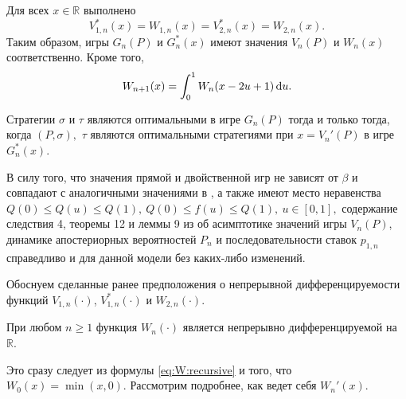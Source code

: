 \begin{theorem}\label{theorem:dual:relations}
  Для всех $x \in \mathbb{R}$ выполнено
  \begin{equation}\label{eq:duality:relationships}
    V_{1,n}^*(x) = W_{1,n}(x) = V_{2,n}^*(x) = W_{2,n}(x).
  \end{equation}
  Таким образом, игры $G_n(P)$ и $G_n^*(x)$ имеют значения $V_n(P)$ и $W_n(x)$
  соответственно. Кроме того,
  \begin{equation}\label{eq:W:recursive}
    W_{n+1}(x) = \int_0^1 W_n(x - 2u + 1) \mathop{}\!\mathrm{d} u.
  \end{equation}
\end{theorem}

\begin{theorem}\label{theorem:optimal-strategies}
  Стратегии $\sigma$ и $\tau$ являются оптимальными в игре $G_n(P)$ тогда и
  только тогда, когда $(P, \sigma),$ $\tau$ являются оптимальными стратегиями
  при $x = V_n'(P)$ в игре $G_n^*(x)$.
\end{theorem}

В силу того, что значения прямой и двойственной игр не зависят от $\beta$ и
совпадают с аналогичными значениями в \cite{demeyer02}, а также имеют место
неравенства %
$ Q(0) \leqslant Q(u) \leqslant Q(1),\ Q(0) \leqslant f(u) \leqslant Q(1),\ u
\in [0, 1], $ %
содержание следствия 4, теоремы 12 и леммы 9 из \cite{demeyer02} об асимптотике
значений игры $V_n(P)$, динамике апостериорных вероятностей $P_n$ и
последовательности ставок $p_{1,n}$ справедливо и для данной модели без
каких-либо изменений.

Обоснуем сделанные ранее предположения о непрерывной дифференцируемости функций
$V_{1,n}(\cdot)$, $V_{1,n}^*(\cdot)$ и $W_{2,n}(\cdot)$.

\begin{proposition}
  При любом $n \geqslant 1$ функция $W_n(\cdot)$ является непрерывно
  дифференцируемой на $\mathbb{R}$.
\end{proposition}
Это сразу следует из формулы \eqref{eq:W:recursive} и того, что $W_0(x) =
\min(x, 0)$. Рассмотрим подробнее, как ведет себя $W_n'(x)$.

